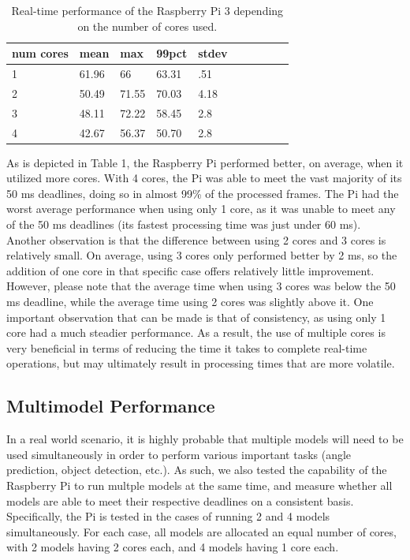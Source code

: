 \documentclass[10pt, conference]{IEEEtran}
\begin{document}
\begin{table}[h]
  \centering
  \begin{tabular} {| l | l | l | l | l | l | l | l | l | l |}
    \hline
    \textbf{num cores} & \textbf{mean} & \textbf{max} & \textbf{99pct} & \textbf{stdev} \\ \hline 
    1 & 61.96 & 66 & 63.31 &  .51\\ \hline
    2 & 50.49 & 71.55 & 70.03 & 4.18 \\ \hline
    3 & 48.11 & 72.22 & 58.45 & 2.8 \\ \hline
    4 & 42.67 & 56.37 & 50.70 & 2.8 \\
    \hline
  \end{tabular}
  \caption{Real-time performance of the Raspberry Pi 3 depending on the number of cores used.}
\end{table}

As is depicted in Table 1, the Raspberry Pi performed better, on average, when it utilized more 
cores. With 4 cores, the Pi was able to meet the vast majority of its 50 ms deadlines, doing so in 
almost 99\% of the processed frames. The Pi had the worst average performance when using only 1 core, 
as it was unable to meet any of the 50 ms deadlines (its fastest processing time was just under 60 
ms). Another observation is that the difference between using 2 cores and 3 cores is relatively 
small. On average, using 3 cores only performed better by 2 ms, so the addition of one core in that 
specific case offers relatively little improvement. However, please note that the average time when 
using 3 cores was below the 50 ms deadline, while the average time using 2 cores was slightly above it. 
One important observation that can be made is that of consistency, as using only 1 core had a much 
steadier performance. As a result, the use of multiple cores is very beneficial in terms of reducing 
the time it takes to complete real-time operations, but may ultimately result in processing times 
that are more volatile.

\subsection{Multimodel Performance}
In a real world scenario, it is highly probable that multiple models will need to be used 
simultaneously in order to perform various important tasks (angle prediction, object detection, 
etc.)\cite{}. As such, we also tested the capability of the Raspberry Pi to run multple models at the 
same time, and measure whether all models are able to meet their respective deadlines on a consistent 
basis. Specifically, the Pi is tested in the cases of running 2 and 4 models simultaneously. For each 
case, all models are allocated an equal number of cores, with 2 models having 2 cores each, and 4 
models having 1 core each.
\end{document}
